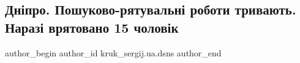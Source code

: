  
 
 
 
 

\subsection{Дніпро.  Пошуково-рятувальні роботи тривають. Наразі врятовано 15 чоловік}
\label{sec:14_01_2023.fb.kruk_sergij.ua.dsns.1.dn_pro___poshukovo_r}

\ifcmt
 author_begin
   author_id kruk_sergij.ua.dsns
 author_end
\fi
